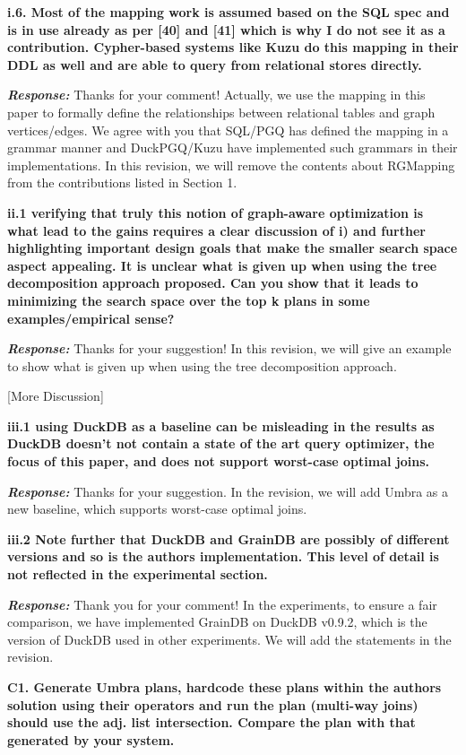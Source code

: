\textbf{
i.6. Most of the mapping work is assumed based on the SQL spec and is in use already as per [40] and [41] which is why I do not see it as a contribution. Cypher-based systems like Kuzu do this mapping in their DDL as well and are able to query from relational stores directly.}

\textbf{\textit{Response: }}
Thanks for your comment! Actually, we use the mapping in this paper to formally define the relationships between relational tables and graph vertices/edges. We agree with you that SQL/PGQ has defined the mapping in a grammar manner and DuckPGQ/Kuzu have implemented such grammars in their implementations. In this revision, we will remove the contents about RGMapping from the contributions listed in Section 1.

\textbf{
ii.1 verifying that truly this notion of graph-aware optimization is what lead to the gains requires a clear discussion of i) and further highlighting important design goals that make the smaller search space aspect appealing.
It is unclear what is given up when using the tree decomposition approach proposed. Can you show that it leads to minimizing the search space over the top k plans in some examples/empirical sense?}

\textbf{\textit{Response: }}
Thanks for your suggestion! In this revision, we will give an example to show what is given up when using the tree decomposition approach. 

[More Discussion]


\textbf{
iii.1 using DuckDB as a baseline can be misleading in the results
as DuckDB doesn't not contain a state of the art query optimizer, the focus of this paper, and does not support worst-case optimal joins.}

\textbf{\textit{Response: }}
Thanks for your suggestion. In the revision, we will add Umbra as a new baseline, which supports worst-case optimal joins.

\textbf{
iii.2 Note further that DuckDB and GrainDB are possibly of different versions and so is the authors implementation. This level of detail is not reflected in the experimental section.}

\textbf{\textit{Response: }}
Thank you for your comment! In the experiments, to ensure a fair comparison, we have implemented GrainDB on DuckDB v0.9.2, which is the version of DuckDB used in other experiments. We will add the statements in the revision.


\textbf{
C1. Generate Umbra plans, hardcode these plans within the authors solution using their operators and run the plan (multi-way joins) should use the adj. list intersection. Compare the plan with that generated by your system. }

